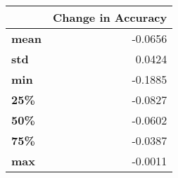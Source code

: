 \begin{tabular}{lr}
\toprule
{} &  Change in Accuracy \\
\midrule
\textbf{mean} &             -0.0656 \\
\textbf{std } &              0.0424 \\
\textbf{min } &             -0.1885 \\
\textbf{25\% } &             -0.0827 \\
\textbf{50\% } &             -0.0602 \\
\textbf{75\% } &             -0.0387 \\
\textbf{max } &             -0.0011 \\
\bottomrule
\end{tabular}

